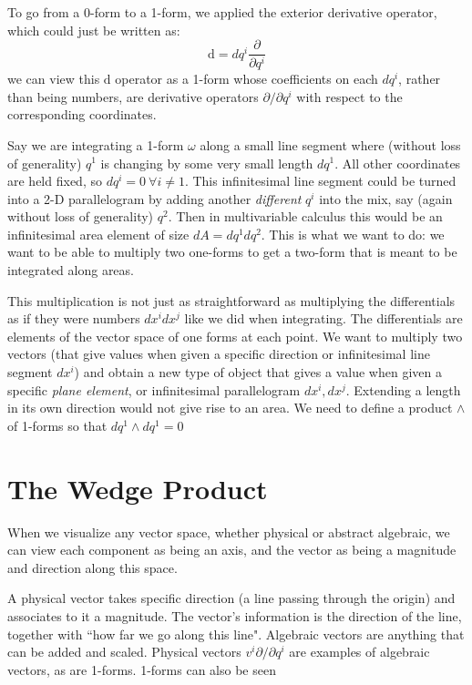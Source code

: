 	To go from a 0-form to a 1-form, we applied the exterior derivative operator, which could just be written as:
	\begin{equation}
		\mathrm d = dq^i \frac{\partial}{\partial q^i}
	\end{equation}
	we can view this $\mathrm d$ operator as a 1-form whose coefficients on each $dq^i$, rather than being numbers, are derivative operators $\partial/\partial q^i$ with respect to the corresponding coordinates.
	
	Say we are integrating a 1-form $\omega$ along a small line segment where (without loss of generality) $q^1$ is changing by some very small length $dq^1$. All other coordinates are held fixed, so $dq^i = 0 ~ \forall i \neq 1$. This infinitesimal line segment could be turned into a 2-D parallelogram by adding another \emph{different} $q^i$ into the mix, say (again without loss of generality) $q^2$. Then in multivariable calculus this would be an infinitesimal area element of size $dA = dq^1 dq^2$. This is what we want to do: we want to be able to multiply two one-forms to get a two-form that is meant to be integrated along areas. 
	
	This multiplication is not just as straightforward as multiplying the differentials as if they were numbers $dx^i dx^j$ like we did when integrating. The differentials are elements of the vector space of one forms at each point. We want to multiply two vectors (that give values when given a specific direction or infinitesimal line segment $dx^i$) and obtain a new type of object that gives a value when given a specific \emph{plane element}, or infinitesimal parallelogram $dx^i, dx^j$. Extending a length in its own direction would not give rise to an area. We need to define a product $\wedge$ of 1-forms so that $dq^1 \wedge dq^1 = 0$ 
	
	\section{The Wedge Product} %
	\label{sec:the_wedge_product}
	
	When we visualize any vector space, whether physical or abstract algebraic, we can view each component as being an axis, and the vector as being a magnitude and direction along this space. 
	
	A physical vector takes specific direction (a line passing through the origin) and associates to it a magnitude. The vector's information is the direction of the line, together with ``how far we go along this line". Algebraic vectors are anything that can be added and scaled. Physical vectors $v^i \partial/\partial q^i$ are examples of algebraic vectors, as are 1-forms. 1-forms can also be seen
	
